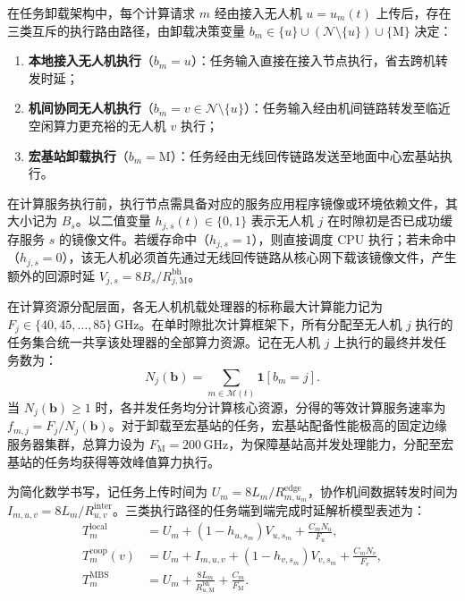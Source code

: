 在任务卸载架构中，每个计算请求 $m$ 经由接入无人机 $u = u_m(t)$ 上传后，存在三类互斥的执行路由路径，由卸载决策变量 $b_m \in \{u\} \cup (\mathcal N \setminus \{u\}) \cup \{\mathrm M\}$ 决定：
\begin{enumerate}
    \item \textbf{本地接入无人机执行}（$b_m = u$）：任务输入直接在接入节点执行，省去跨机转发时延；
    \item \textbf{机间协同无人机执行}（$b_m = v \in \mathcal N \setminus \{u\}$）：任务输入经由机间链路转发至临近空闲算力更充裕的无人机 $v$ 执行；
    \item \textbf{宏基站卸载执行}（$b_m = \mathrm M$）：任务经由无线回传链路发送至地面中心宏基站执行。
\end{enumerate}

在计算服务执行前，执行节点需具备对应的服务应用程序镜像或环境依赖文件，其大小记为 $B_s$。以二值变量 $h_{j,s}(t) \in \{0, 1\}$ 表示无人机 $j$ 在时隙初是否已成功缓存服务 $s$ 的镜像文件。若缓存命中（$h_{j,s}=1$），则直接调度 CPU 执行；若未命中（$h_{j,s}=0$），该无人机必须首先通过无线回传链路从核心网下载该镜像文件，产生额外的回源时延 $V_{j,s} = 8B_s / R^{\mathrm{bh}}_{j,\mathrm M}$。

在计算资源分配层面，各无人机机载处理器的标称最大计算能力记为 $F_j \in \{40, 45, \dots, 85\}\,\mathrm{GHz}$。在单时隙批次计算框架下，所有分配至无人机 $j$ 执行的任务集合统一共享该处理器的全部算力资源。记在无人机 $j$ 上执行的最终并发任务数为：
\begin{equation}
    N_j(\mathbf b) = \sum_{m\in\mathcal M(t)} \mathbf 1[b_m = j].
    \label{eq:ch3-final-load}
\end{equation}
当 $N_j(\mathbf b) \geq 1$ 时，各并发任务均分计算核心资源，分得的等效计算服务速率为 $f_{m,j} = F_j / N_j(\mathbf b)$。对于卸载至宏基站的任务，宏基站配备性能极高的固定边缘服务器集群，总算力设为 $F_{\mathrm M} = 200\,\mathrm{GHz}$，为保障基站高并发处理能力，分配至宏基站的任务均获得等效峰值算力执行。

为简化数学书写，记任务上传时间为 $U_m = 8L_m / R^{\mathrm{edge}}_{m,u_m}$，协作机间数据转发时间为 $I_{m,u,v} = 8L_m / R^{\mathrm{inter}}_{u,v}$。三类执行路径的任务端到端完成时延解析模型表述为：
\begin{equation}
    \begin{aligned}
    T_m^{\mathrm{local}} &= U_m + (1 - h_{u,s_m}) V_{u,s_m} + \frac{C_m N_u}{F_u},\\
    T_m^{\mathrm{coop}}(v) &= U_m + I_{m,u,v} + (1 - h_{v,s_m}) V_{v,s_m} + \frac{C_m N_v}{F_v},\\
    T_m^{\mathrm{MBS}} &= U_m + \frac{8L_m}{R^{\mathrm{bh}}_{u,\mathrm M}} + \frac{C_m}{F_{\mathrm M}}.
    \end{aligned}
    \label{eq:ch3-service-three-paths}
\end{equation}

